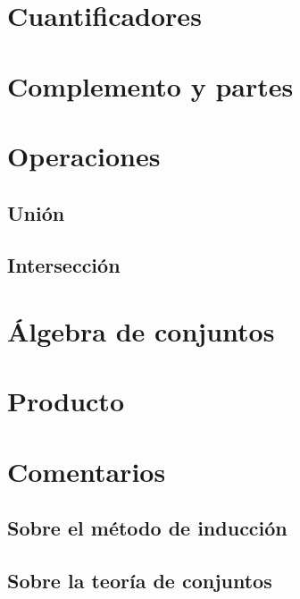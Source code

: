 \documentclass[10pt]{book}
\begin{document}
  \section{Cuantificadores}
  


  \section{Complemento y partes}
  


  \section{Operaciones}

    \subsection{Unión}
    

    \subsection{Intersección}
    


  \section{Álgebra de conjuntos}
  


  \section{Producto}
  


  \section{Comentarios}
  

    \subsection{Sobre el método de inducción}
    

    \subsection{Sobre la teoría de conjuntos}
    
\end{document}
